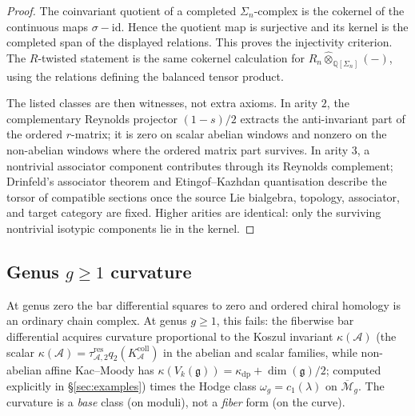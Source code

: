\documentclass[11pt,reqno]{amsart}
\theoremstyle{definition}
\theoremstyle{remark}
\newcommand{\cA}{\mathcal{A}}
\newcommand{\cM}{\mathcal{M}}
\newcommand{\fg}{\mathfrak{g}}
\newcommand{\id}{\mathrm{id}}
\numberwithin{equation}{section}
\begin{document}
\begin{proof}
The coinvariant quotient of a completed \(\Sigma_n\)-complex is the
cokernel of the continuous maps \(\sigma-\id\). Hence the quotient map
is surjective and its kernel is the completed span of the displayed
relations. This proves the injectivity criterion. The \(R\)-twisted
statement is the same cokernel calculation for
\(R_n\widehat\otimes_{\mathbb Q[\Sigma_n]}(-)\), using the relations
defining the balanced tensor product.

The listed classes are then witnesses, not extra axioms.  In arity
\(2\), the complementary Reynolds projector
\((1-s)/2\) extracts the anti-invariant part of the ordered
\(r\)-matrix; it is zero on scalar abelian windows and nonzero on
the non-abelian windows where the ordered matrix part survives.
In arity \(3\), a nontrivial associator component contributes through
its Reynolds complement; Drinfeld's associator theorem and
Etingof--Kazhdan quantisation describe the torsor of compatible
sections once the source Lie bialgebra, topology, associator, and
target category are fixed. Higher arities are identical: only the
surviving nontrivial isotypic components lie in the kernel.
\end{proof}


\subsection{Genus $g \geq 1$ curvature}
\label{subsec:genus-curvature}

At genus zero the bar differential squares to zero and
ordered chiral homology is an ordinary chain complex.
At genus $g \geq 1$, this fails: the fiberwise bar
differential acquires curvature proportional to the Koszul
invariant $\kappa(\cA)$ (the scalar
$\kappa(\cA)=\tau_{\cA,2}^{\mathrm{res}}q_2(K_\cA^{\mathrm{coll}})$
in the abelian and scalar families, while non-abelian affine
Kac--Moody has
$\kappa(V_k(\fg))=\kappa_{\mathrm{dp}}+\dim(\fg)/2$; computed
explicitly in \S\ref{sec:examples}) times the Hodge class
$\omega_g = c_1(\lambda)$ on $\overline{\cM}_g$.
The curvature is a \emph{base} class (on moduli),
not a \emph{fiber} form (on the curve).
\end{document}
